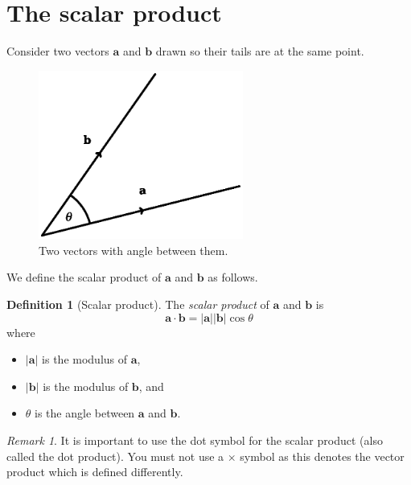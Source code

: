 \documentclass[12pt,a4paper]{article}
\theoremstyle{definition}
\newtheorem{definition}[proposition]{Definition}
\theoremstyle{remark}
\newtheorem{remark}[proposition]{Remark}
\newcommand{\bvec}[1]{\mathrm{\mathbf{#1}}}
\begin{document}
\newpage
\section{The scalar product}

Consider two vectors \(\bvec{a}\) and \(\bvec{b}\) drawn so their tails are at the same point. 
\begin{figure}[!h]
\begin{center}
\includegraphics[width=0.6\textwidth]{vectors.eps}
\end{center}
\caption{Two vectors with angle between them.}
\label{vectors}
\end{figure}

We define the scalar product of \(\bvec{a}\) and \(\bvec{b}\) as follows. 

\begin{definition}[Scalar product]
The \emph{scalar product} of \(\bvec{a}\) and \(\bvec{b}\) is
\[
\bvec{a}\cdot \bvec{b} = \lvert\bvec{a}\rvert \lvert\bvec{b}\rvert \cos \theta
\]
where
\begin{itemize}
\item \(\lvert\bvec{a}\rvert\) is the modulus of \(\bvec{a}\),
\item \(\lvert\bvec{b}\rvert\) is the modulus of \(\bvec{b}\), and
\item \(\theta\) is the angle between \(\bvec{a}\) and \(\bvec{b}\). 
\end{itemize}
\end{definition}

\begin{remark}
It is important to use the dot symbol for the scalar product (also called the dot product). You must not use a \(\times\) symbol as this denotes the vector product which is defined differently. 
\end{remark}
\end{document}
